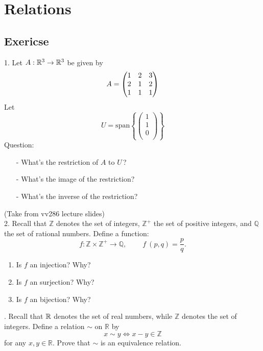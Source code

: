 \documentclass[12pt]{article}
\begin{document}
\section{Relations}
\subsection{Exericse}
    1. Let $A: \mathbb{R}^3 \to \mathbb{R}^3 $ be given by
    $$A=\begin{pmatrix} 1 &2 &3 \\ 2 &1 &2 \\ 1 &1 &1 \\ \end{pmatrix}$$
    Let 
    $$U=\text{span} {\left \{\begin{pmatrix}1\\1\\0\\\end{pmatrix}\right \} }$$
    Question:
    \begin{itemize}
        \item[-]What's the restriction of $A$ to $U\,$? 
        \item[-]What's the image of the restriction?
        \item[-]What's the inverse of the restriction? 
    \end{itemize}
    (Take from vv286 lecture slides)
    \vspace{1em}\\
    2. Recall that $\mathbb{Z}$ denotes the set of integers, $\mathbb{Z}^+$ the set of positive integers, and $\mathbb{Q}$ the set of rational numbers. 
    Define a function: 
    \begin{equation*}
    f: \mathbb{Z} \times \mathbb{Z}^+ \to \mathbb{Q},~~~~~~~~~~
    f~(p,q) = \frac{p}{q}.
    \end{equation*}
    \begin{enumerate}
    	\item Is $f$ an injection? Why?
    	\item Is $f$ an surjection? Why?
    	\item Is $f$ an bijection? Why?
    \end{enumerate}
    . Recall that $\mathbb{R}$ denotes the set of real numbers, while $\mathbb{Z}$ denotes the set of integers. 
    Define a relation $\sim$ on $\mathbb{R}$ by
    \begin{equation*}
        x \sim y \Leftrightarrow x - y \in \mathbb{Z}
    \end{equation*}
    for any $x, y \in \mathbb{R}$. Prove that $\sim$ is an equivalence relation.
\end{document}
